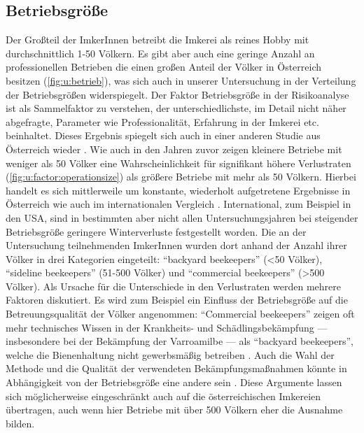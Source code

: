 \subsection{Betriebsgröße}

Der Großteil der ImkerInnen betreibt die Imkerei als reines Hobby mit durchschnittlich 1-50 Völkern. Es gibt aber auch eine geringe Anzahl an professionellen Betrieben die einen großen Anteil der Völker in Österreich besitzen (\cref{fig:u:betrieb}), was sich auch in unserer Untersuchung in der Verteilung der Betriebsgrößen widerspiegelt. Der Faktor Betriebsgröße in der Risikoanalyse ist als Sammelfaktor zu verstehen, der unterschiedlichste, im Detail nicht näher abgefragte, Parameter wie Professionalität, Erfahrung in der Imkerei etc. beinhaltet. Dieses Ergebnis spiegelt sich auch in einer anderen Studie aus Österreich wieder \citep{morawetz2019}.
\newline
Wie auch in den Jahren zuvor zeigen kleinere Betriebe mit weniger als 50 Völker eine Wahrscheinlichkeit für signifikant höhere Verlustraten (\cref{fig:u:factor:operationsize}) als größere Betriebe mit mehr als 50 Völkern. Hierbei handelt es sich mittlerweile um konstante, wiederholt aufgetretene Ergebnisse in Österreich wie auch im internationalen Vergleich \citep{brodschneider2016,brodschneider2018,crailsheim2018,oberreiter2020,vanderzee2014,gray2020}. International, zum Beispiel in den USA, sind in bestimmten aber nicht allen Untersuchungsjahren bei steigender Betriebsgröße geringere Winterverluste festgestellt worden. Die an der Untersuchung teilnehmenden ImkerInnen wurden dort anhand der Anzahl ihrer Völker in drei Kategorien eingeteilt: \enquote{backyard beekeepers} (<50 Völker), \enquote{sideline beekeepers} (51-500 Völker) und \enquote{commercial beekeepers} (>500 Völker). Als Ursache für die Unterschiede in den Verlustraten werden mehrere Faktoren diskutiert. Es wird zum Beispiel ein Einfluss der Betriebsgröße auf die Betreuungsqualität der Völker angenommen: \enquote{Commercial beekeepers} zeigen oft mehr technisches Wissen in der Krankheits- und Schädlingsbekämpfung --- insbesondere bei der Bekämpfung der Varroamilbe --- als \enquote{backyard beekeepers}, welche die Bienenhaltung nicht gewerbsmäßig betreiben \citep{lee2015}. Auch die Wahl der Methode und die Qualität der verwendeten Bekämpfungsmaßnahmen könnte in Abhängigkeit von der Betriebsgröße eine andere sein \citep{underwood2019, thoms2019a}. Diese Argumente lassen sich möglicherweise eingeschränkt auch auf die österreichischen Imkereien übertragen, auch wenn hier Betriebe mit über 500 Völkern eher die Ausnahme bilden.

